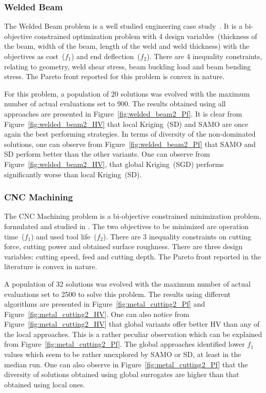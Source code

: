\subsubsection{Welded Beam}
The Welded Beam problem is a well studied engineering case study~\cite{Deb2000constraint}. It is a bi-objective constrained optimization problem with 4 design variables~(thickness of the beam, width of the beam, length of the weld and weld thickness) with the objectives as cost~($f_1$) and end deflection~($f_2$). There are 4 inequality constraints, relating to geometry, weld shear stress, beam buckling load and beam bending stress. The Pareto front reported for this problem is convex in nature.   

For this problem, a population of 20 solutions was evolved with the maximum number of actual evaluations set to 900. The results obtained using all approaches are presented in Figure~\ref{fig:welded_beam2_Pf}. It is clear from Figure~\ref{fig:welded_beam2_HV} that local Kriging~(SD) and SAMO are once again the best performing strategies. In terms of diversity of the non-dominated solutions, one can observe from Figure~\ref{fig:welded_beam2_Pf} that SAMO and SD perform better than the other variants. One can observe from Figure~\ref{fig:welded_beam2_HV}, that global Kriging~(SGD) performs significantly worse than local Kriging~(SD).

\subsubsection{CNC Machining}
The CNC Machining problem is a bi-objective constrained minimization problem, formulated and studied in \cite{Cus2003cutting,Quiza2006cnc}. The two objectives to be minimized are operation time~($f_1$) and used tool life~($f_2$). There are 3 inequality constraints on cutting force, cutting power and obtained surface roughness. There are three design variables: cutting speed, feed and cutting depth. The Pareto front reported in the literature is convex in nature.

A population of 32 solutions was evolved with the maximum number of actual evaluations set to 2500 to solve this problem. The results using different algorithms are presented in Figure~\ref{fig:metal_cutting2_Pf} and Figure~\ref{fig:metal_cutting2_HV}. One can also notice from Figure~\ref{fig:metal_cutting2_HV} that global variants offer better HV than any of the local approaches. This is a rather peculiar observation which can be explained from Figure~\ref{fig:metal_cutting2_Pf}. The global approaches identified lower $f_1$ values which seem to be rather unexplored by SAMO or SD, at least in the median run. One can also observe in Figure~\ref{fig:metal_cutting2_Pf} that the diversity of solutions obtained using global surrogates are higher than that obtained using local ones. 

